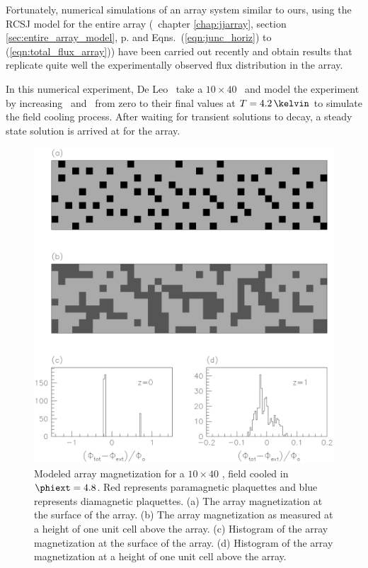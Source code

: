 Fortunately, numerical simulations of an array system similar to ours,
using the RCSJ model for the entire array (\cf\ chapter \ref{chap:jjarray},
section \ref{sec:entire_array_model}, p. \pageref{sec:entire_array_model}
and  Eqns.~(\ref{eqn:junc_horiz}) to 
(\ref{eqn:total_flux_array})) have been carried out recently%
\cite{deleo_unpublished} and obtain results that replicate quite
well the experimentally observed flux distribution in the array.

In this numerical experiment, De Leo \etal\ take a $10\times 40$ 
\jja\ and model the experiment by increasing \betal\
and \betac\ from zero to their final values at $T=4.2\,\kelvin$
to simulate the field cooling process. After waiting for
transient solutions to decay, a steady state solution is arrived 
at for the array. 

\begin{figure}
\includegraphics[width=5.0in]{figs/pme_theory/fig46.eps}
\caption[Modeled array magnetization for a $10\times 40$ \jja,
field cooled in $\phiext = 4.8$]
{Modeled array magnetization for a $10\times 40$ \jja, field
cooled in $\phiext = 4.8$. 
Red represents paramagnetic plaquettes and blue represents
diamagnetic plaquettes.
(a) The array magnetization at the surface of the array. 
(b) The array magnetization as measured at a height of one
unit cell above the array. 
(c) Histogram of the array magnetization at the surface of the
array.
(d) Histogram of the array magnetization at a height of one
unit cell above the array. }
\label{fig:model_array_mag}
\end{figure}

